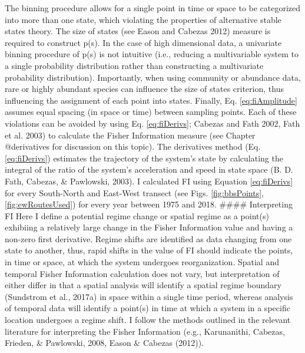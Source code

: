 \documentclass[12pt,twoside,openany]{reedthesis}
\begin{document}
The binning procedure allows for a single point in time or space to be
categorized into more than one state, which violating the properties of
alternative stable states theory. The size of states (see Eason and
Cabezas 2012) measure is required to construct p(s). In the case of high
dimensional data, a univariate binning procedure of p(s) is not
intuitive (i.e., reducing a multivariable system to a single probability
distribution rather than constructing a multivariate probability
distribution). Importantly, when using community or abundance data, rare
or highly abundant species can influence the size of states criterion,
thus influencing the assignment of each point into states. Finally, Eq.
\eqref{eq:fiAmplitude} assumes equal spacing (in space or time) between
sampling points. Each of these violations can be avoided by using Eq.
\eqref{eq:fiDerivs}; Cabezas and Fath 2002, Fath et al. 2003) to calculate
the Fisher Information measure (see Chapter @derivatives for discussion
on this topic). The derivatives method (Eq. \eqref{eq:fiDerivs}) estimates
the trajectory of the system's state by calculating the integral of the
ratio of the system's acceleration and speed in state space (B. D. Fath,
Cabezas, \& Pawlowski, 2003). I calculated FI using Equation
\eqref{eq:fiDerivs} for every South-North and East-West transect (see
Figs. \ref{fig:bbsPoints}, \ref{fig:ewRoutesUsed}) for every year
between 1975 and 2018. \#\#\#\# Interpreting FI Here I define a
potential regime change or spatial regime as a point(s) exhibiing a
relatively large change in the Fisher Information value and having a
non-zero first derivative. Regime shifts are identified as data changing
from one state to another, thus, rapid shifts in the value of FI should
indicate the points, in time or space, at which the system undergoes
reorganization. Spatial and temporal Fisher Information calculation does
not vary, but interpretation of either differ in that a spatial analysis
will identify a spatial regime boundary (Sundstrom et al., 2017a) in
space within a single time period, whereas analysis of temporal data
will identify a point(s) in time at which a system in a specific
location undergoes a regime shift. I follow the methods outlined in the
relevant literature for interpreting the Fisher Information (e.g.,
Karunanithi, Cabezas, Frieden, \& Pawlowski, 2008, Eason \& Cabezas
(2012)).
\end{document}
